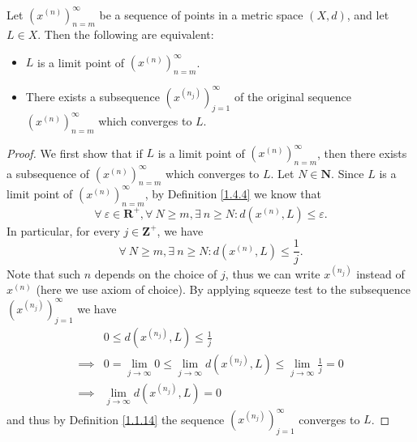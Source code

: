 \begin{proposition}\label{1.4.5}
    Let \((x^{(n)})_{n = m}^\infty\) be a sequence of points in a metric space \((X, d)\), and let \(L \in X\).
    Then the following are equivalent:
    \begin{itemize}
        \item \(L\) is a limit point of \((x^{(n)})_{n = m}^\infty\).
        \item There exists a subsequence \((x^{(n_j)})_{j = 1}^\infty\) of the original sequence \((x^{(n)})_{n = m}^\infty\) which converges to \(L\).
    \end{itemize}
\end{proposition}

\begin{proof}
    We first show that if \(L\) is a limit point of \((x^{(n)})_{n = m}^\infty\), then there exists a subsequence of \((x^{(n)})_{n = m}^\infty\) which converges to \(L\).
    Let \(N \in \mathbf{N}\).
    Since \(L\) is a limit point of \((x^{(n)})_{n = m}^\infty\), by Definition \ref{1.4.4} we know that
    \[
        \forall\ \varepsilon \in \mathbf{R}^+, \forall\ N \geq m, \exists\ n \geq N : d(x^{(n)}, L) \leq \varepsilon.
    \]
    In particular, for every \(j \in \mathbf{Z}^+\), we have
    \[
        \forall\ N \geq m, \exists\ n \geq N : d(x^{(n)}, L) \leq \frac{1}{j}.
    \]
    Note that such \(n\) depends on the choice of \(j\), thus we can write \(x^{(n_j)}\) instead of \(x^{(n)}\) (here we use axiom of choice).
    By applying squeeze test to the subsequence \((x^{(n_j)})_{j = 1}^\infty\) we have
    \begin{align*}
                 & 0 \leq d(x^{(n_j)}, L) \leq \frac{1}{j}                                                                     \\
        \implies & 0 = \lim_{j \to \infty} 0 \leq \lim_{j \to \infty} d(x^{(n_j)}, L) \leq \lim_{j \to \infty} \frac{1}{j} = 0 \\
        \implies & \lim_{j \to \infty} d(x^{(n_j)}, L) = 0
    \end{align*}
    and thus by Definition \ref{1.1.14} the sequence \((x^{(n_j)})_{j = 1}^\infty\) converges to \(L\).


\end{proof}
